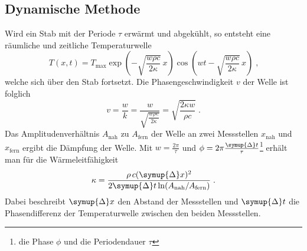 \subsection{Dynamische Methode}
\label{sec:dyM}
Wird ein Stab mit der Periode $\tau$ erwärmt und abgekühlt, so entsteht eine räumliche und zeitliche Temperaturwelle
\begin{equation}
    T(x,t)=T_\text{max} \exp \left({-\sqrt{\frac{w \rho c}{2 \kappa}}}\, x \right)\cos \left( wt-\sqrt{\frac{w \rho c}{2 \kappa}}\, x\right)\; \text{,}
\end{equation}
welche sich über den Stab fortsetzt. Die Phasengeschwindigkeit $v$ der Welle ist folglich
\begin{equation}
    v=\frac{w}{k}=\frac{w}{\sqrt{\frac{w \rho c}{2 \kappa}}}=\sqrt{\frac{2\kappa w}{\rho c}}\; \text{.}
\end{equation}
Das Amplitudenverhältnis $A_\text{nah}$ zu $A_\text{fern}$ der Welle an zwei Messstellen $x_\text{nah}$ und $x_\text{fern}$ ergibt die Dämpfung der Welle.
Mit $w=\frac{2\pi}{\tau}$ und $\phi=2\pi \frac{\symup{\Delta}t}{\tau}$\footnote{die Phase $\phi$ und die Periodendauer $\tau$} erhält man für die Wärmeleitfähigkeit
\begin{equation}
    \kappa=\frac{\rho\, c (\symup{\Delta}x)^2}{2\symup{\Delta}t \ln (A_\text{nah}/A_\text{fern})}\; \text{.}
\end{equation}
Dabei beschreibt $\symup{\Delta}x$ den Abstand der Messstellen und $\symup{\Delta}t$ die Phasendifferenz der Temperaturwelle zwischen den beiden Messstellen.


